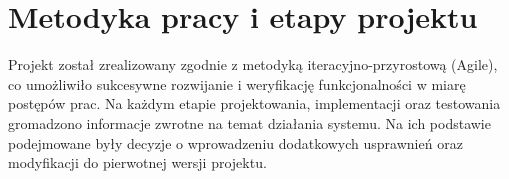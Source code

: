     

\section{Metodyka pracy i etapy projektu}
Projekt został zrealizowany zgodnie z metodyką iteracyjno-przyrostową (Agile), co umożliwiło sukcesywne rozwijanie i weryfikację funkcjonalności w miarę postępów prac. Na każdym etapie projektowania, implementacji oraz testowania gromadzono informacje zwrotne na temat działania systemu. Na ich podstawie podejmowane były decyzje o wprowadzeniu dodatkowych usprawnień oraz modyfikacji do pierwotnej 
wersji projektu.

